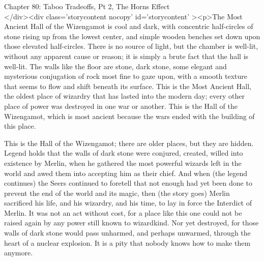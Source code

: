 
Chapter 80: Taboo Tradeoffs, Pt 2, The Horns Effect\\
</div><div  class='storycontent nocopy' id='storycontent' ><p>The Most Ancient 
Hall of the Wizengamot is cool and dark, with concentric half-circles of stone 
rising up from the lowest center, and simple wooden benches set down upon those 
elevated half-circles. There is no source of light, but the chamber is 
well-lit, without any apparent cause or reason; it is simply a brute fact that 
the hall is well-lit. The walls like the floor are stone, dark stone, some 
elegant and mysterious conjugation of rock most fine to gaze upon, with a 
smooth texture that seems to flow and shift beneath its surface. This is the 
Most Ancient Hall, the oldest place of wizardry that has lasted into the modern 
day; every other place of power was destroyed in one war or another. This is 
the Hall of the Wizengamot, which is most ancient because the wars ended with 
the building of this place.

This is the Hall of the Wizengamot; there are older places, but they are 
hidden. Legend holds that the walls of dark stone were conjured, created, 
willed into existence by Merlin, when he gathered the most powerful wizards 
left in the world and awed them into accepting him as their chief. And when 
(the legend continues) the Seers continued to foretell that not enough had yet 
been done to prevent the end of the world and its magic, then (the story goes) 
Merlin sacrificed his life, and his wizardry, and his time, to lay in force the 
Interdict of Merlin. It was not an act without cost, for a place like this one 
could not be raised again by any power still known to wizardkind. Nor yet 
destroyed, for those walls of dark stone would pass unharmed, and perhaps 
unwarmed, through the heart of a nuclear explosion. It is a pity that nobody 
knows how to make them anymore.

